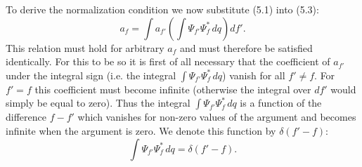 To derive the normalization condition we now substitute (5.1) into (5.3):
\[
  a_f=\int a_{f'}\left(\int\Psi_{f'}\Psi_f^*\,dq\right)df'.
\]
This relation must hold for arbitrary $a_f$ and must therefore be satisfied
identically. For this to be so it is first of all necessary that the
coefficient of $a_{f'}$ under the integral sign (i.e. the integral
$\int\Psi_{f'}\Psi_f^*\,dq$) vanish for all $f'\ne f$. For $f'=f$ this
coefficient must become infinite (otherwise the integral over $df'$ would
simply be equal to zero). Thus the integral $\int\Psi_{f'}\Psi_f^*\,dq$ is a
function of the difference $f-f'$ which vanishes for non-zero values of the
argument and becomes infinite when the argument is zero. We denote this function
by $\delta(f'-f)$:
\begin{equation}
  \int\Psi_{f'}\Psi_f^*\,dq=\delta(f'-f).
  \tag{5.4}
\end{equation}

